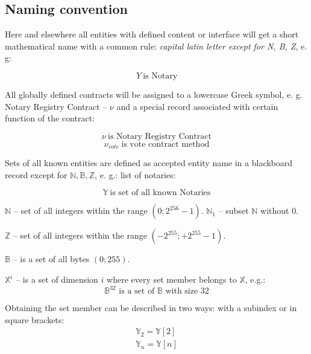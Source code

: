 \documentclass[12pt]{report}
\begin{document}
\subsection{Naming convention}
\label{tech-review-naming}
\begin{multicols}{2}
Here and elsewhere all entities with defined content or interface will get a short mathematical name with a common rule: \textit{capital latin letter except for N, B, Z}, e. g:

\begin{equation}
Y \ \text{is Notary}
\end{equation}

All globally defined contracts will be assigned to a lowercase Greek symbol, e. g. Notary Registry Contract – $\nu$ and a special record associated with certain function of the contract:

\begin{equation}
\nu \ \text{is Notary Registry Contract}
\end{equation}
\begin{equation}
\nu_{vote} \ \text{is vote contract method}
\end{equation}

Sets of all known entities are defined as accepted entity name in a blackboard record except for $\mathbb{N}, \mathbb{B}, \mathbb{Z}$, e. g.: list of notaries:

\begin{equation}
\mathbb{Y} \ \text{is set of all known Notaries}
\end{equation}

$\mathbb{N}$ – set of all integers within the range $(0; 2^{256} - 1)$. $\mathbb{N}_1$ – subset $\mathbb{N}$ without 0.

$\mathbb{Z}$ – set of all integers within the range $(-2^{255}; +2^{255} - 1)$.

$\mathbb{B}$ – is a set of all bytes $(0; 255)$. 

$\mathbb{X}^{i}$ – is a set of dimension $i$ where every set member belongs to $\mathbb{X}$, e.g.:
\begin{equation}
\mathbb{B}^{32} \text{ is a set of } \mathbb{B} \text{ with size } 32
\end{equation}

Obtaining the set member can be described in two ways: with a subindex or in square brackets:
\begin{equation}
\begin{aligned}
\mathbb{Y}_2 = \mathbb{Y}[2] \\
\mathbb{Y}_n = \mathbb{Y}[n] 
\end{aligned}
\end{equation}


\end{multicols}
\end{document}
